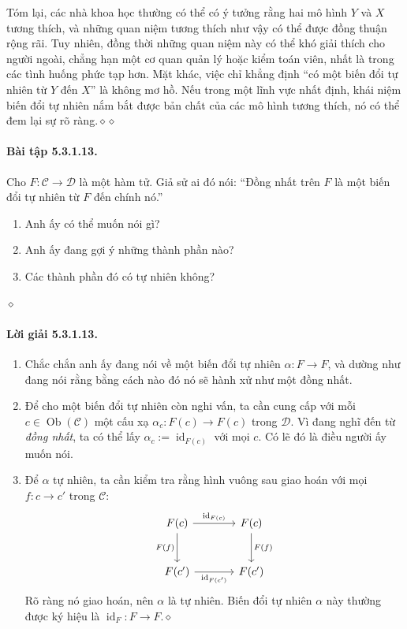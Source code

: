 Tóm lại, các nhà khoa học thường có thể có ý tưởng rằng hai mô hình $Y$ và $X$ tương thích, và những quan niệm tương thích như vậy có thể được đồng thuận rộng rãi. Tuy nhiên, đồng thời những quan niệm này có thể khó giải thích cho người ngoài, chẳng hạn một cơ quan quản lý hoặc kiểm toán viên, nhất là trong các tình huống phức tạp hơn. Mặt khác, việc
chỉ khẳng định ``có một biến đổi tự nhiên từ $Y$ đến $X$'' là không mơ hồ. Nếu trong một lĩnh vực nhất định, khái niệm biến đổi tự nhiên nắm bắt được bản chất của các mô hình tương thích, nó có thể đem lại sự rõ ràng.\hfill$\diamond\diamond$
\paragraph{Bài tập 5.3.1.13.} Cho $F:\mathcal C\to\mathcal D$ là một hàm tử. Giả sử ai đó nói: ``Đồng nhất trên $F$ là một biến đổi tự nhiên từ $F$ đến chính nó.''
\begin{enumerate}[label=\alph*.]
\item Anh ấy có thể muốn nói gì?
\item Anh ấy đang gợi ý những thành phần nào?
\item Các thành phần đó có tự nhiên không?
\end{enumerate}\hfill$\diamond$
\paragraph{Lời giải 5.3.1.13.}
\begin{enumerate}[label=\alph*.]
\item Chắc chắn anh ấy đang nói về một biến đổi tự nhiên $\alpha:F\to F$, và dường như đang nói rằng bằng cách nào đó nó sẽ hành xử như một đồng nhất.
\item Để cho một biến đổi tự nhiên còn nghi vấn, ta cần cung cấp với mỗi $c\in\operatorname{Ob}(\mathcal C)$ một cấu xạ $\alpha_c:F(c)\to F(c)$ trong $\mathcal D$. Vì đang nghĩ đến từ \emph{đồng nhất}, ta có thể lấy $\alpha_c:=\operatorname{id}_{F(c)}$ với mọi $c$. Có lẽ đó là điều người ấy muốn nói.
\item Để $\alpha$ tự nhiên, ta cần kiểm tra rằng hình vuông sau giao hoán với mọi $f:c\to c'$ trong $\mathcal C$:
\[\begin{tikzcd}[column sep=large,row sep=large]
F(c)\arrow[r,"\operatorname{id}_{F(c)}"]\arrow[d,"F(f)"']&F(c)\arrow[d,"F(f)"]\\F(c')\arrow[r,"\operatorname{id}_{F(c')}"']&F(c')
\end{tikzcd}\]
Rõ ràng nó giao hoán, nên $\alpha$ là tự nhiên. Biến đổi tự nhiên $\alpha$ này thường được ký hiệu là $\operatorname{id}_F:F\to F$.\unskip\nobreak\hfill$\diamond$
\end{enumerate}
